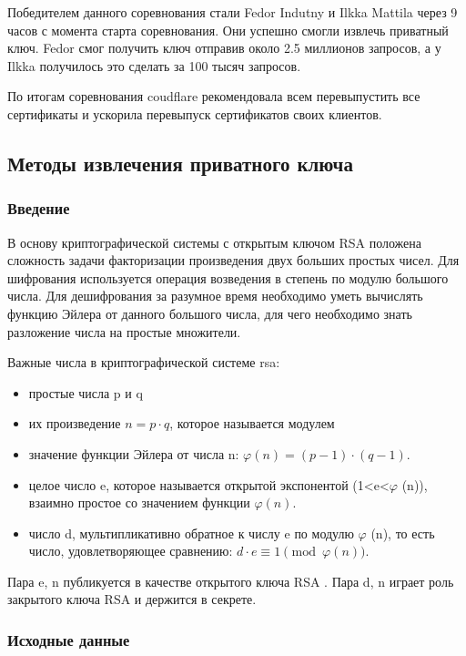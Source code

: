 \documentclass[20pt]{article}
\begin{document}
Победителем данного соревнования стали Fedor Indutny\cite{heartbleed/Indutny} и
Ilkka Mattila через 9 часов с момента старта соревнования. Они успешно смогли
извлечь приватный ключ. Fedor смог получить ключ отправив около 2.5 миллионов
запросов, а у Ilkka получилось это сделать за 100 тысяч запросов.

По итогам соревнования coudflare рекомендовала всем перевыпустить все сертификаты
и ускорила перевыпуск сертификатов своих клиентов.

\subsection{Методы извлечения приватного ключа \cite{playing-hide-and-seek-with-stored-keys} }

\subsubsection{Введение}

В основу криптографической системы с открытым ключом RSA положена сложность задачи
факторизации произведения двух больших простых чисел. Для шифрования используется
операция возведения в степень по модулю большого числа. Для дешифрования за
разумное время необходимо уметь вычислять функцию Эйлера от данного большого
числа, для чего необходимо знать разложение числа на простые множители.

Важные числа в криптографической системе rsa:
\begin{itemize}
  \item простые числа p и q
  \item их произведение $n=p \cdot q$, которое называется модулем
  \item значение функции Эйлера от числа n: $\varphi (n)=(p-1)\cdot (q-1)$.
  \item целое число e, которое называется открытой экспонентой
    (1<e<$\varphi$ (n)), взаимно простое со значением функции $\varphi(n)$.
  \item число d, мультипликативно обратное к числу e по модулю
    $\varphi$ (n), то есть число, удовлетворяющее сравнению: $d\cdot e\equiv 1{\pmod {\varphi (n)}}$.
\end{itemize}

Пара {e, n} публикуется в качестве открытого ключа RSA .
Пара {d, n} играет роль закрытого ключа RSA и держится в секрете.

\subsubsection{Исходные данные}
\end{document}
